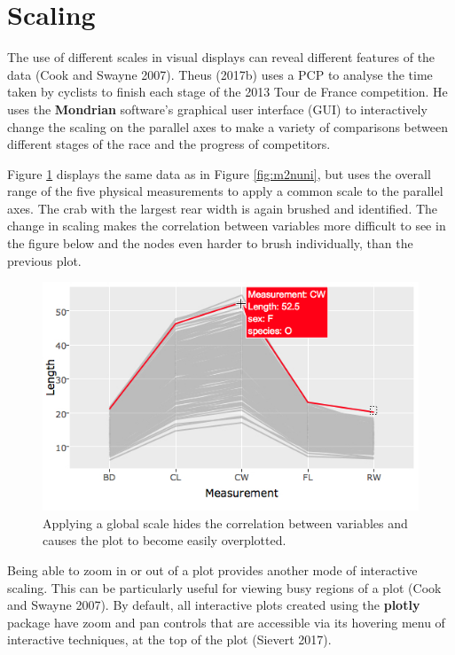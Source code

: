 \documentclass[]{book}
\theoremstyle{definition}
\theoremstyle{definition}
\theoremstyle{definition}
\theoremstyle{remark}
\begin{document}
\section{Scaling}\label{scaling}

The use of different scales in visual displays can reveal different
features of the data (Cook and Swayne 2007). Theus (2017b) uses a PCP to
analyse the time taken by cyclists to finish each stage of the 2013 Tour
de France competition. He uses the \textbf{Mondrian} software's
graphical user interface (GUI) to interactively change the scaling on
the parallel axes to make a variety of comparisons between different
stages of the race and the progress of competitors.

Figure \ref{fig:m2nglobal} displays the same data as in Figure
\ref{fig:m2nuni}, but uses the overall range of the five physical
measurements to apply a common scale to the parallel axes. The crab with
the largest rear width is again brushed and identified. The change in
scaling makes the correlation between variables more difficult to see in
the figure below and the nodes even harder to brush individually, than
the previous plot.

\begin{figure}[htbp]
\centering
\includegraphics{files/m2n_global.jpg}
\caption{\label{fig:m2nglobal}Applying a global scale hides the correlation
between variables and causes the plot to become easily overplotted.}
\end{figure}

Being able to zoom in or out of a plot provides another mode of
interactive scaling. This can be particularly useful for viewing busy
regions of a plot (Cook and Swayne 2007). By default, all interactive
plots created using the \textbf{plotly} package have zoom and pan
controls that are accessible via its hovering menu of interactive
techniques, at the top of the plot (Sievert 2017).
\end{document}
